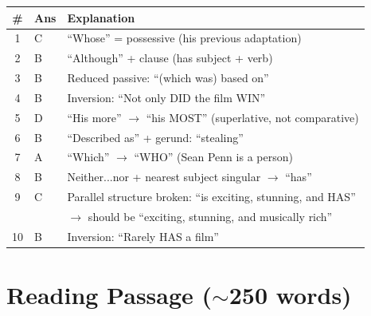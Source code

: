 \documentclass[10pt,a4paper]{article}
\begin{document}
\begin{center}
\begin{tabular}{cll}
\toprule
\# & Ans & Explanation \\
\midrule
1 & C & ``Whose'' = possessive (his previous adaptation) \\
2 & B & ``Although'' + clause (has subject + verb) \\
3 & B & Reduced passive: ``(which was) based on'' \\
4 & B & Inversion: ``Not only DID the film WIN'' \\
5 & D & ``His more'' $\to$ ``his MOST'' (superlative, not comparative) \\
6 & B & ``Described as'' + gerund: ``stealing'' \\
7 & A & ``Which'' $\to$ ``WHO'' (Sean Penn is a person) \\
8 & B & Neither...nor + nearest subject singular $\to$ ``has'' \\
9 & C & Parallel structure broken: ``is exciting, stunning, and HAS'' \\
  &   & $\to$ should be ``exciting, stunning, and musically rich'' \\
10 & B & Inversion: ``Rarely HAS a film'' \\
\bottomrule
\end{tabular}
\end{center}

\section*{Reading Passage ($\sim$250 words)}
\end{document}
